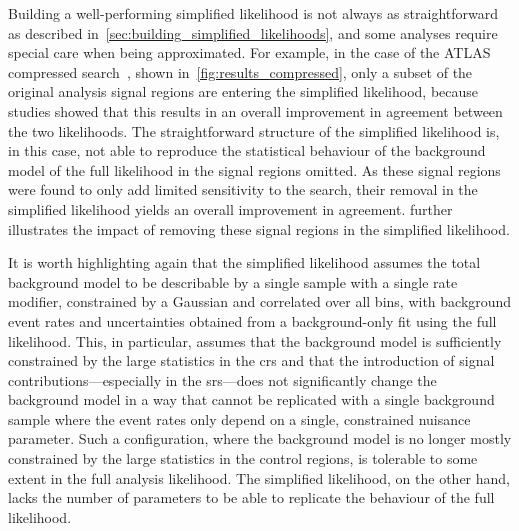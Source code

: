 Building a well-performing simplified likelihood is not always as straightforward as described in~\cref{sec:building_simplified_likelihoods}, and some analyses require special care when being approximated. For example, in the case of the ATLAS compressed search~\cite{SUSY-2018-16}, shown in~\cref{fig:results_compressed}, only a subset of the original analysis signal regions are entering the simplified likelihood, because studies showed that this results in an overall improvement in agreement between the two likelihoods. The straightforward structure of the simplified likelihood is, in this case, not able to reproduce the statistical behaviour of the background model of the full likelihood in the signal regions omitted. As these signal regions were found to only add limited sensitivity to the search, their removal in the simplified likelihood yields an overall improvement in agreement.  further illustrates the impact of removing these signal regions in the simplified likelihood.

It is worth highlighting again that the simplified likelihood assumes the total background model to be describable by a single sample with a single rate modifier, constrained by a Gaussian and correlated over all bins, with background event rates and uncertainties obtained from a background-only fit using the full likelihood.
This, in particular, assumes that the background model is sufficiently constrained by the large statistics in the \glspl{cr} and that the introduction of signal contributions---especially in the \glspl{sr}---does not significantly change the background model in a way that cannot be replicated with a single background sample where the event rates only depend on a single, constrained nuisance parameter.
Such a configuration, where the background model is no longer mostly constrained by the large statistics in the control regions, is tolerable to some extent in the full analysis likelihood. The simplified likelihood, on the other hand, lacks the number of parameters to be able to replicate the behaviour of the full likelihood.  


